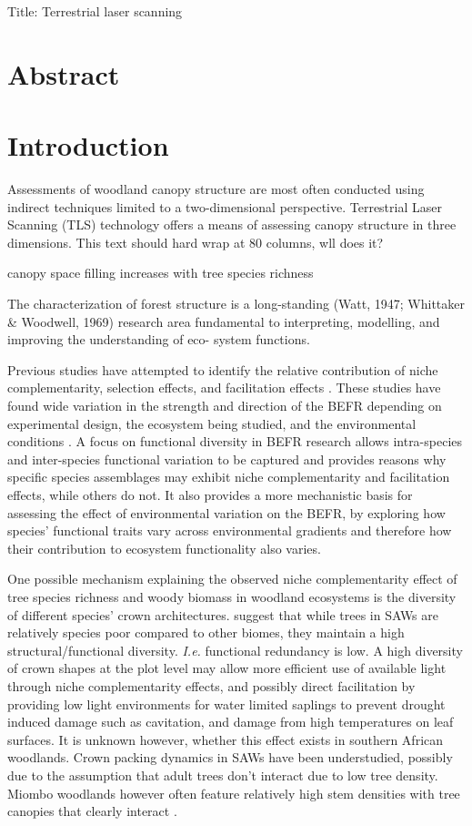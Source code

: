 \documentclass[11pt,a4paper]{article}
\newcommand{\titletext}{Terrestrial laser scanning}
\begin{document}
{\Large{Title: \titletext{}}}


\section*{Abstract}

\section{Introduction}

Assessments of woodland canopy structure are most often conducted using indirect techniques limited to a two-dimensional perspective. Terrestrial Laser Scanning (TLS) technology offers a means of assessing canopy structure in three dimensions. This text should hard wrap at 80 columns, wll does it?

canopy space filling increases with tree species richness

The characterization of forest structure is a long-standing (Watt, 1947; Whittaker & Woodwell, 1969) research area fundamental to interpreting, modelling, and improving the understanding of eco- system functions. 

Previous studies have attempted to identify the relative contribution of niche complementarity, selection effects, and facilitation effects \citep{Scherer-Lorenzen2014}. These studies have found wide variation in the strength and direction of the BEFR depending on experimental design, the ecosystem being studied, and the environmental conditions \citep{Vila2005}. A focus on functional diversity in BEFR research allows intra-species and inter-species functional variation to be captured and provides reasons why specific species assemblages may exhibit niche complementarity and facilitation effects, while others do not. It also provides a more mechanistic basis for assessing the effect of environmental variation on the BEFR, by exploring how species' functional traits vary across environmental gradients and therefore how their contribution to ecosystem functionality also varies. 

One possible mechanism explaining the observed niche complementarity effect of tree species richness and woody biomass in woodland ecosystems is the diversity of different species' crown architectures. \citet{Solbrig1996} suggest that while trees in SAWs are relatively species poor compared to other biomes, they maintain a high structural/functional diversity. \textit{I.e.} functional redundancy is low. A high diversity of crown shapes at the plot level may allow more efficient use of available light through niche complementarity effects, and possibly direct facilitation by providing low light environments for water limited saplings to prevent drought induced damage such as cavitation, and damage from high temperatures on leaf surfaces. It is unknown however, whether this effect exists in southern African woodlands. Crown packing dynamics in SAWs have been understudied, possibly due to the assumption that adult trees don't interact due to low tree density. Miombo woodlands however often feature relatively high stem densities with tree canopies that clearly interact \citep{Campbell2002}.
\end{document}
